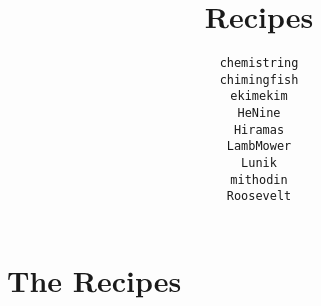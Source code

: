 \documentclass[12pt,a4paper,twoside]{book}
\title{Recipes}
\author{\texttt{chemistring}\\%
		\texttt{chimingfish}\\%
		\texttt{ekimekim}\\%
		\texttt{HeNine}\\%
		\texttt{Hiramas}\\%
		\texttt{LambMower}\\%
		\texttt{Lunik}\\%
		\texttt{mithodin}\\%
		\texttt{Roosevelt}
}
\begin{document}
	\maketitle
	\tableofcontents
	\clearpage

	\chapter{The Recipes}

	
    \clearpage
	
    \clearpage
    
	\clearpage
	
	\clearpage
	
    \clearpage
    
	\clearpage
	
	\clearpage
	
	\clearpage
	
	\clearpage
	
	\clearpage
	
	\clearpage
	
	\clearpage
	
	\clearpage
	
	\clearpage
	
	\clearpage
	
	\clearpage
	
	\clearpage
	
	\clearpage
	
	\clearpage
	
	\clearpage
	
	\clearpage
	
	\clearpage
	
	\clearpage
	
	\clearpage
	
\end{document}
